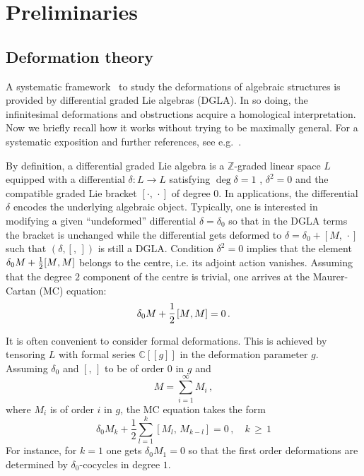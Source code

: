 \documentclass[a4paper,12pt]{article}
\numberwithin{equation}{section} %
\renewcommand{\geq}{\,{\geqslant}\,}
\newcommand{\commut}[2]{[#1{,}\,#2]}
\newcommand{\half}{\mathchoice{%
    \ffrac{1}{2}}{\frac{1}{2}}{\frac{1}{2}}{\frac{1}{2}}}
\newcommand{\hhalf}{\frac{1}{2}}
\newcommand{\ffrac}[2]{\raisebox{.5pt}%
  {\footnotesize$\displaystyle\frac{#1}{#2}$}\kern1pt}
\newcommand{\fC}{\mathbb{C}}
\newcommand{\fZ}{\mathbb{Z}}
\newcommand{\jordi}[1]{\textcolor{violet}{#1}}
\begin{document}
\section{Preliminaries}
\label{sec:prelim}
\subsection{Deformation theory}
\label{sec:deform-theory}



A systematic framework~\cite{Gerstenhaber:1964} to study the deformations of algebraic structures is provided by differential graded Lie algebras (DGLA). In so doing, the infinitesimal deformations and obstructions acquire a homological interpretation. Now we briefly recall how it works without trying to be maximally general. For a systematic exposition and further references, see e.g.~\cite{Manetti2005}. 

By definition, a differential graded Lie algebra is a $\fZ$-graded linear space $L$ equipped with a differential $\delta:L\to L$ satisfying $\deg{\delta}=1$ , $\delta^2=0$ and the compatible graded Lie bracket $\commut{\cdot}{\cdot}$ of degree $0$. In applications, the differential $\delta$ encodes the underlying algebraic object. 
Typically, one is interested in modifying a given ``undeformed'' differential $\delta=\delta_0$ so that in the DGLA terms the bracket is unchanged while the differential gets deformed to $\delta=\delta_0+\commut{M}{\cdot}$ such that $(\delta,\commut{}{})$ is still a DGLA. 
Condition $\delta^2=0$ implies that the element $\delta_0 M+\half\commut{M}{M}$ belongs to the centre, i.e. its adjoint action vanishes. Assuming that the degree $2$ component of the centre is trivial, one arrives at the Maurer-Cartan (MC) equation:
\begin{equation}
\label{eq_mc_equation}
\delta_0 M+\half\commut{M}{M}=0\,.
\end{equation}

It is often convenient to consider formal deformations. This is achieved by tensoring $L$ with formal series $\fC[[g]]$ in the deformation parameter $g$. Assuming $\delta_0$ and $\commut{}{}$ to be of order $0$ in $g$ and 
\begin{equation}
M=\sum_{i=1}^\infty M_i    \,,
\end{equation}
where $M_i$ is of order $i$ in $g$,
the MC equation takes the form
\begin{equation}
\label{MC}
\delta_0 M_k
+\hhalf\sum_{l=1}^{k}
\commut{M_l}{M_{k-l}}=0\,, \quad k \geq 1
\end{equation}
For instance, for $k=1$ one gets $\delta_0 M_1=0$ so that the first order deformations are determined by $\delta_0$-cocycles in degree $1$.
\end{document}
